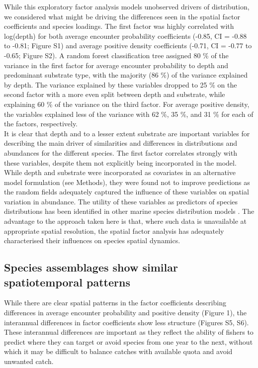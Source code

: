 \documentclass[fleqn,10pt]{wlscirep}
\begin{document}
\begin{linenumbers}
While this exploratory factor analysis models unobserved drivers of
distribution, we considered what might be driving the differences seen in the
spatial factor coefficients and species loadings. The first factor was highly
correlated with log(depth) for both average encounter probability coefficients
(-0.85, CI = -0.88 to -0.81; Figure S1) and average positive density
coefficients (-0.71, CI = -0.77 to -0.65; Figure S2). A random forest
classification tree assigned 80 \% of the variance in the first factor for
average encounter probability to depth and predominant substrate type, with the
majority (86 \%) of the variance explained by depth.  The variance explained by
these variables dropped to 25 \% on the second factor with a more even split
between depth and substrate, while explaining 60 \% of the variance on the
third factor.  For average positive density, the variables explained less of
the variance with 62 \%, 35 \%, and 31 \% for each of the factors,
respectively.\\ 

It is clear that depth and to a lesser extent substrate are important variables
for describing the main driver of similarities and differences in distributions
and abundances for the different species. The first factor correlates strongly
with these variables, despite them not explicitly being incorporated in the
model. While depth and substrate were incorporated as covariates in an
alternative model formulation (see Methods), they were found not to improve
predictions as the random fields adequately captured the influence of these
variables on spatial variation in abundance. The utility of these variables as
predictors of species distributions has been identified in other marine species
distribution models \cite{Robinson2011}. The advantage to the approach taken
here is that, where such data is unavailable at appropriate spatial resolution,
the spatial factor analysis has adequately characterised their influences on
species spatial dynamics.\\

\subsection*{Species assemblages show similar spatiotemporal 
	patterns\\} 
While there are clear spatial patterns in the factor coefficients describing
differences in average  encounter probability and positive density (Figure 1),
the interannual differences in factor coefficients show less structure (Figures
S5, S6). These interannual differences are important as they reflect the
ability of fishers to predict where they can target or avoid species from one
year to the next, without which it may be difficult to balance catches with
available quota and avoid unwanted catch.\\


\end{linenumbers}
\end{document}
